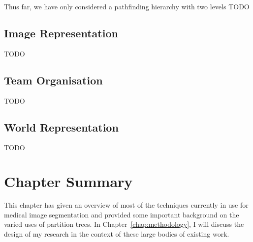 Thus far, we have only considered a pathfinding hierarchy with two levels TODO

\subsection{Image Representation}

TODO

\subsection{Team Organisation}

TODO

\subsection{World Representation}

TODO

\section{Chapter Summary}

This chapter has given an overview of most of the techniques currently in use for medical image segmentation and provided some important background on the varied uses of partition trees. In Chapter~\ref{chap:methodology}, I will discuss the design of my research in the context of these large bodies of existing work.
